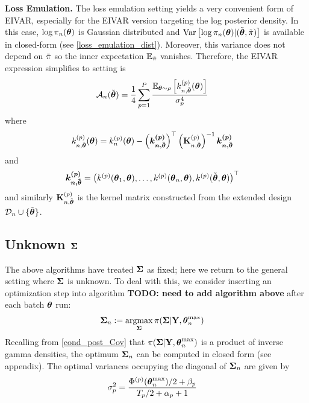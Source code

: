 \documentclass[12pt]{article}
\begin{document}
\bigskip
\noindent
\textbf{Loss Emulation.} The loss emulation setting yields a very convenient form of EIVAR, especially for the EIVAR version targeting the log posterior density. In this case,
$\log \pi_{n}(\boldsymbol{\theta})$ is Gaussian distributed and $\mathrm{Var}\left[\log \pi_{n}(\boldsymbol{\theta}) | (\tilde{\boldsymbol{\theta}}, \tilde{\pi}) \right]$ is 
available in closed-form (see \ref{loss_emulation_dist}). Moreover, this variance does not depend on $\tilde{\pi}$ so the inner expectation $\mathbb{E}_{\tilde{\pi}}$ vanishes. 
Therefore, the EIVAR expression simplifies to  
setting is 
\begin{align}
\mathcal{A}_{n}(\tilde{\boldsymbol{\theta}}) &= \frac{1}{4} \sum_{p = 1}^{P} \frac{\mathbb{E}_{\boldsymbol{\theta} \sim \rho}\left[k_{n, \tilde{\boldsymbol{\theta}}}^{(p)}(\boldsymbol{\theta})\right]}{\sigma_{p}^4}
\end{align}
where 
\begin{align*}
k_{n, \tilde{\boldsymbol{\theta}}}^{(p)}(\boldsymbol{\theta}) &= k_{n}^{(p)}(\boldsymbol{\theta}) - \left(\boldsymbol{k^{(p)}_{n,\tilde{\boldsymbol{\theta}}}}\right)^\top \left(\mathbf{K}_{n, \tilde{\boldsymbol{\theta}}}^{(p)}\right)^{-1} \boldsymbol{k^{(p)}_{n, \tilde{\boldsymbol{\theta}}}}
\end{align*}
and 
\begin{align*}
\boldsymbol{k^{(p)}_{n, \tilde{\boldsymbol{\theta}}}} &= \begin{pmatrix} k^{(p)}(\boldsymbol{\theta}_1, \boldsymbol{\theta}), \dots, 
														       k^{(p)}(\boldsymbol{\theta}_{n}, \boldsymbol{\theta}), 
														       k^{(p)}(\tilde{\boldsymbol{\theta}}, \boldsymbol{\theta})  \end{pmatrix}^\top 
\end{align*}
and similarly $\mathbf{K}_{n, \tilde{\boldsymbol{\theta}}}^{(p)}$ is the kernel matrix constructed from the extended design $\mathcal{D}_{n} \cup \{\tilde{\boldsymbol{\theta}}\}$.

\subsection{Unknown $\boldsymbol{\Sigma}$}
The above algorithms have treated $\boldsymbol{\Sigma}$ as fixed; here we return to the general setting where $\boldsymbol{\Sigma}$ is unknown. To deal with this, we consider inserting an 
optimization step into algorithm \textbf{TODO: need to add algorithm above} after each batch $\boldsymbol{\theta}$ run:
\begin{align}
\boldsymbol{\Sigma}_{n} &:= \operatorname*{argmax}_{\boldsymbol{\Sigma}} \pi(\boldsymbol{\Sigma}|\mathbf{Y}, \boldsymbol{\theta}_{n}^{\text{max}}) \label{Cov_optimization}
\end{align}
Recalling from \ref{cond_post_Cov} that $\pi(\boldsymbol{\Sigma}|\mathbf{Y}, \boldsymbol{\theta}_{n}^{\text{max}})$ is a product of inverse gamma densities, the optimum $\boldsymbol{\Sigma}_{n}$ can 
be computed in closed form (see appendix). The optimal variances occupying the diagonal of $\boldsymbol{\Sigma}_{n}$ are given by 
\begin{align}
\sigma_{p}^2 &= \frac{\Phi^{(p)}(\boldsymbol{\theta}_{n}^{\text{max}})/2 + \beta_{p}}{T_{p}/2 + \alpha_{p} + 1}
\end{align}
\end{document}
